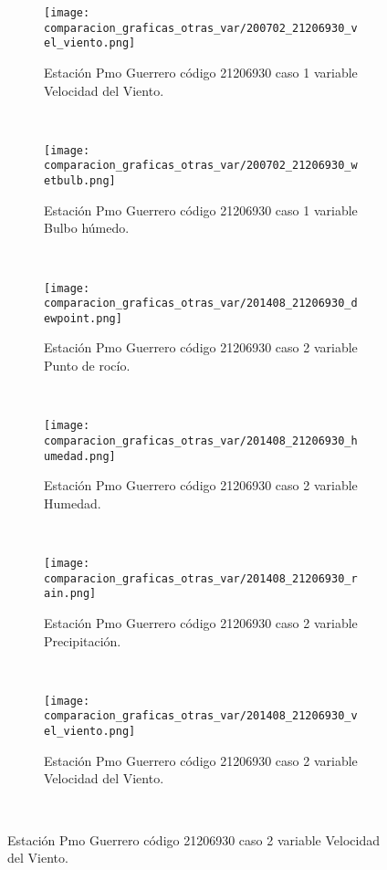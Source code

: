 \begin{figure}[H]
\centering
\begin{subfigure}[normla]{0.4\textwidth}
\caption{Estación Pmo Guerrero código 21206930 caso 1 variable Velocidad del Viento.}
\texttt{[image: comparacion\_graficas\_otras\_var/200702\_21206930\_vel\_viento.png]}
\end{subfigure}
~
\begin{subfigure}[normla]{0.4\textwidth}
\caption{Estación Pmo Guerrero código 21206930 caso 1 variable Bulbo húmedo.}
\texttt{[image: comparacion\_graficas\_otras\_var/200702\_21206930\_wetbulb.png]}
\end{subfigure}
~
\begin{subfigure}[normla]{0.4\textwidth}
\caption{Estación Pmo Guerrero código 21206930 caso 2 variable Punto de rocío.}
\texttt{[image: comparacion\_graficas\_otras\_var/201408\_21206930\_dewpoint.png]}
\end{subfigure}
~
\begin{subfigure}[normla]{0.4\textwidth}
\caption{Estación Pmo Guerrero código 21206930 caso 2 variable Humedad.}
\texttt{[image: comparacion\_graficas\_otras\_var/201408\_21206930\_humedad.png]}
\end{subfigure}
~
\begin{subfigure}[normla]{0.4\textwidth}
\caption{Estación Pmo Guerrero código 21206930 caso 2 variable Precipitación.}
\texttt{[image: comparacion\_graficas\_otras\_var/201408\_21206930\_rain.png]}
\end{subfigure}
~
\begin{subfigure}[normla]{0.4\textwidth}
\caption{Estación Pmo Guerrero código 21206930 caso 2 variable Velocidad del Viento.}
\texttt{[image: comparacion\_graficas\_otras\_var/201408\_21206930\_vel\_viento.png]}
\end{subfigure}
~
\end{figure}
           
